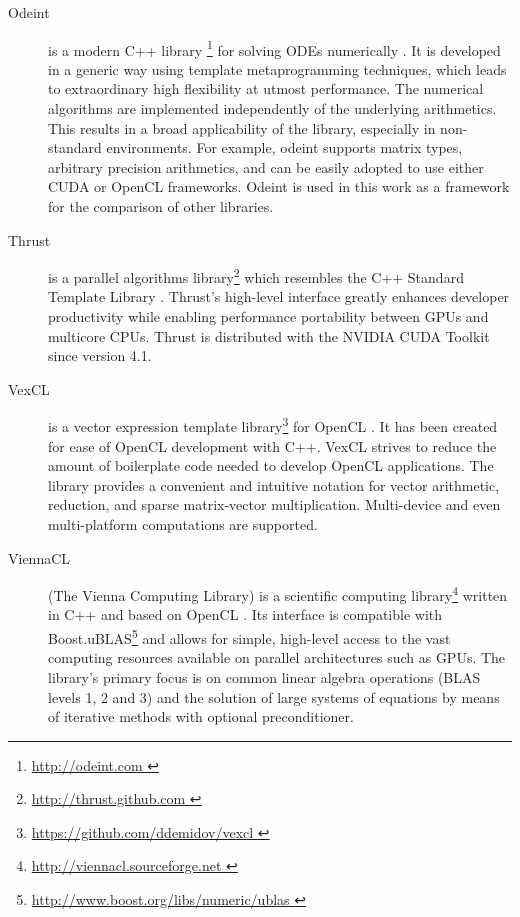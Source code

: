 \documentclass[final]{siamltex}
\begin{document}
\begin{description}
    \item[Odeint] is a modern C++ library \footnote{ \href{ http://odeint.com }{
	http://odeint.com } } for solving ODEs numerically \cite{OdeintRef1, OdeintRef2}.
	It is developed in a generic
	way using template metaprogramming techniques, which leads to extraordinary high
	flexibility at utmost performance. The numerical algorithms are
	implemented independently of the underlying arithmetics. This results
	in a broad applicability of the library, especially in non-standard
	environments.  For example, odeint supports matrix types, arbitrary
	precision arithmetics, and can be easily adopted to use either CUDA or
	OpenCL frameworks.  Odeint is used in this work as a framework for the
	comparison of other libraries.
    \item[Thrust] is a parallel algorithms library\footnote{ \href{
	http://thrust.github.com }{ http://thrust.github.com }} which resembles
	the C++ Standard Template Library \cite{ThrustRef}.  Thrust's
	high-level interface greatly enhances developer productivity while
	enabling performance portability between GPUs and multicore CPUs.
	Thrust is distributed with the NVIDIA CUDA Toolkit since version 4.1.
    \item[VexCL] is a vector expression template
	library\footnote{ \href{ https://github.com/ddemidov/vexcl }{
	https://github.com/ddemidov/vexcl }} for OpenCL \cite{VexCLRef}. It has
	been created for ease of OpenCL development with C++.  VexCL strives to
	reduce the amount of boilerplate code needed to develop OpenCL
	applications. The library provides a convenient and intuitive notation
	for vector arithmetic, reduction, and sparse matrix-vector
	multiplication.  Multi-device and even multi-platform computations are
	supported.
    \item[ViennaCL] (The Vienna Computing Library) is a scientific computing
	library\footnote{ \href{ http://viennacl.sourceforge.net }{
	http://viennacl.sourceforge.net }} written in C++ and based on OpenCL
	\cite{ViennaCLRef}. Its interface is compatible with 
	Boost.uBLAS\footnote{ \href{ http://www.boost.org/libs/numeric/ublas }
	{ http://www.boost.org/libs/numeric/ublas } }
	and allows for simple, high-level access to the vast
	computing resources available on parallel architectures such as GPUs.
	The library's primary focus is on common linear algebra operations (BLAS
	levels 1, 2 and 3) and the solution of large systems of equations by
	means of iterative methods with optional preconditioner.
\end{description}
\end{document}
